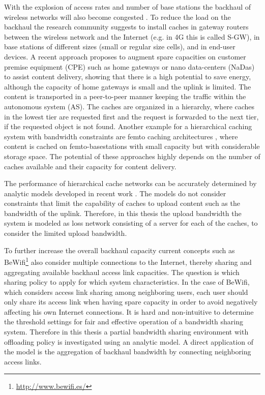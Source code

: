 With the explosion of access rates and number of base stations the backhaul of wireless networks will also become congested \cite{}.
To reduce the load on the backhaul the research community suggests to install caches in gateway routers between the wireless network and the Internet (e.g. in 4G this is called S-GW), in base stations of different sizes (small or regular size cells), and in end-user devices.
A recent approach \cite{valancius2009greening} proposes to augment spare capacities on customer premise equipment (CPE) such as home gateways or nano data-centers (NaDas) to assist content delivery, showing that there is a high potential to save energy, although the capacity of home gateways is small and the uplink is limited.
The content is transported in a peer-to-peer manner keeping the traffic within the autonomous system (AS).
The caches are organized in a hierarchy, where caches in the lowest tier are requested first and the request is forwarded to the next tier, if the requested object is not found.
Another example for a hierarchical caching system with bandwidth constraints are femto caching architectures \cite{golrezaei2013femtocaching}, where content is cached on femto-basestations with small capacity but with considerable storage space.
The potential of these approaches highly depends on the number of caches available and their capacity for content delivery.

The performance of hierarchical cache networks can be accurately determined by analytic models developed in recent work \cite{che2002hierarchical, martina2014unified}.
The models do not consider constraints that limit the capability of caches to upload content such as the bandwidth of the uplink.
Therefore, in this thesis the upload bandwidth the system is modeled as loss network consisting of a server for each of the caches, to consider the limited upload bandwidth.

To further increase the overall backhaul capacity current concepts such as BeWifi\footnote{\url{http://www.bewifi.es/}} also consider multiple connections to the Internet, thereby sharing and aggregating available backhaul access link capacities.
The question is which sharing policy to apply for which system characteristics.
In the case of BeWifi, which considers access link sharing among neighboring users, each user should only share its access link when having spare capacity in order to avoid negatively affecting his own Internet connections.
It is hard and non-intuitive to determine the threshold settings for fair and effective operation of a bandwidth sharing system.
Therefore in this thesis a partial bandwidth sharing environment with offloading policy is investigated using an analytic model.
A direct application of the model is the aggregation of backhaul bandwidth by connecting neighboring access links.


